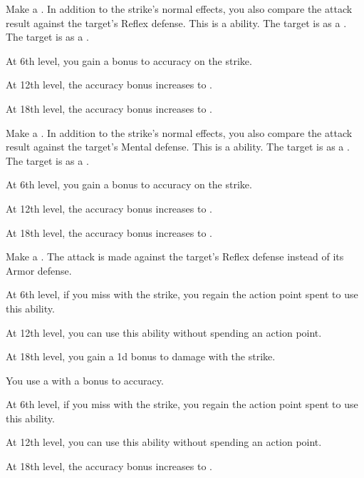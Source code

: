 {             Make a .
            In addition to the strike's normal effects, you also compare the attack result against the target's Reflex defense.
            This is a  ability.
             The target is \slowed as a .
             The target is \immobilized as a .
            \par At 6th level, you gain a  bonus to accuracy on the strike.
            \par At 12th level, the accuracy bonus increases to .
            \par At 18th level, the accuracy bonus increases to .

             Make a .
            In addition to the strike's normal effects, you also compare the attack result against the target's Mental defense.
            This is a  ability.
             The target is \dazed as a .
             The target is \stunned as a .
            \par At 6th level, you gain a  bonus to accuracy on the strike.
            \par At 12th level, the accuracy bonus increases to .
            \par At 18th level, the accuracy bonus increases to .

             Make a .
            The attack is made against the target's Reflex defense instead of its Armor defense.
            \par At 6th level, if you miss with the strike, you regain the action point spent to use this ability.
            \par At 12th level, you can use this ability without spending an action point.
            \par At 18th level, you gain a \plus1d bonus to damage with the strike.

             You use a  with a  bonus to accuracy.
            \par At 6th level, if you miss with the strike, you regain the action point spent to use this ability.
            \par At 12th level, you can use this ability without spending an action point.
            \par At 18th level, the accuracy bonus increases to .

}
